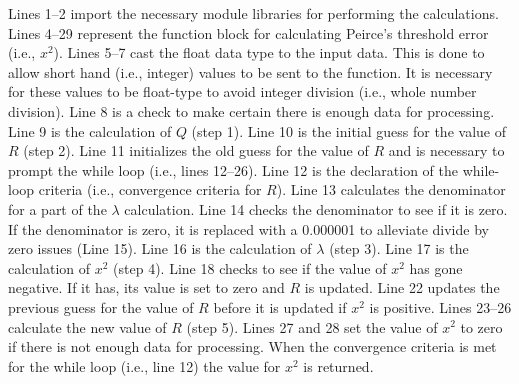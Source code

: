 \noindent Lines 1--2 import the necessary module libraries for performing the calculations.  
Lines 4--29 represent the function block for calculating Peirce's threshold error (i.e., $x^{2}$).  
Lines 5--7 cast the float data type to the input data.  
This is done to allow short hand (i.e., integer) values to be sent to the function.  
It is necessary for these values to be float-type to avoid integer division (i.e., whole number division). 
Line 8 is a check to make certain there is enough data for processing.  
Line 9 is the calculation of $Q$ (step 1).  
Line 10 is the initial guess for the value of $R$ (step 2).  
Line 11 initializes the old guess for the value of $R$ and is necessary to prompt the while loop (i.e., lines 12--26).  
Line 12 is the declaration of the while-loop criteria (i.e., convergence criteria for $R$). 
Line 13 calculates the denominator for a part of the $\lambda$ calculation.  
Line 14 checks the denominator to see if it is zero.  
If the denominator is zero, it is replaced with a 0.000001 to alleviate divide by zero issues (Line 15). 
Line 16 is the calculation of $\lambda$ (step 3).  
Line 17 is the calculation of $x^{2}$ (step 4).  
Line 18 checks to see if the value of $x^{2}$ has gone negative.  
If it has, its value is set to zero and $R$ is updated.  
Line 22 updates the previous guess for the value of $R$ before it is updated if $x^{2}$ is positive.  
Lines 23--26 calculate the new value of $R$ (step 5). 
Lines 27 and 28 set the value of $x^{2}$ to zero if there is not enough data for processing.  
When the convergence criteria is met for the while loop (i.e., line 12) the value for $x^{2}$ is returned.

\newpage

